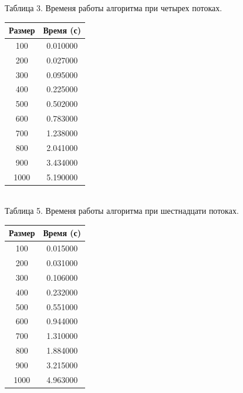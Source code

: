 \documentclass[12pt]{report}
\begin{document}
	\begin{minipage}{0.5\textwidth}
		\begin{center}
			Таблица 3. Временя работы алгоритма при четырех потоках.
			
			\begin{tabular}{|c c|}
				\hline
				Размер & Время (с) \\
				\hline
				100 & 0.010000\\
				\hline
				200 & 0.027000\\
				\hline
				300 & 0.095000\\
				\hline
				400 & 0.225000\\
				\hline
				500 & 0.502000\\
				\hline
				600 & 0.783000\\
				\hline
				700 & 1.238000\\
				\hline
				800 & 2.041000\\
				\hline
				900 & 3.434000\\
				\hline
				1000 & 5.190000\\
				\hline
			\end{tabular}
		
			~\\
		
			Таблица 5. Временя работы алгоритма при шестнадцати потоках.
		
			\begin{tabular}{|c c|}
				\hline
				Размер & Время (с) \\
				\hline
				100 & 0.015000\\
				\hline
				200 & 0.031000\\
				\hline
				300 & 0.106000\\
				\hline
				400 & 0.232000\\
				\hline
				500 & 0.551000\\
				\hline
				600 & 0.944000\\
				\hline
				700 & 1.310000\\
				\hline
				800 & 1.884000\\
				\hline
				900 & 3.215000\\
				\hline
				1000 & 4.963000\\
				\hline
			\end{tabular}
		\end{center}
	\end{minipage}
	\hfill
\end{document}
